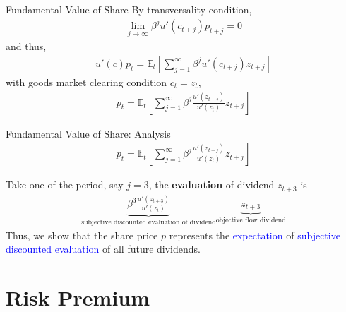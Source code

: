 \documentclass[aspectratio=169,xcolor=dvipsnames]{beamer}
\newcommand{\blue}[1]{\textcolor{blue}{#1}}
\begin{document}
\begin{frame}{Fundamental Value of Share}
\label{slide:Fundamental_Value_of_Share}
    By transversality condition,
    \begin{align}
        \lim_{j\rightarrow \infty} \beta^{j} u'(c_{t+j}) p_{t+j} = 0
    \end{align}
    and thus,
    \begin{align}
        u'(c) p_{t} = \mathbb{E}_{t}\left[
            \sum_{j=1}^{\infty} \beta^{j} u'(c_{t+j}) z_{t+j}
        \right]
    \end{align}
    with goods market clearing condition $ c_{t} = z_{t} $,
    \begin{align}
        p_{t} = \mathbb{E}_{t}\left[
            \sum_{j=1}^{\infty} \beta^{j} \frac{u'(z_{t+j})}{u'(z_{t})} z_{t+j}
        \right]
    \end{align}

\end{frame}

\begin{frame}{Fundamental Value of Share: Analysis}
\label{slide:Fundamental_Value_of_Share__Analysis}
    \begin{align}
        p_{t} = \mathbb{E}_{t}\left[
            \sum_{j=1}^{\infty} \beta^{j} \frac{u'(z_{t+j})}{u'(z_{t})} z_{t+j}
        \right]
    \end{align}

    Take one of the period, say $ j = 3 $, the \textbf{evaluation} of dividend $ z_{t+3} $ is
    \begin{align}
        \underbrace{\beta^{3} \frac{u'(z_{t+3})}{u'(z_{t})}}_{\text{subjective discounted evaluation of dividend}} \underbrace{z_{t+3}}_{\text{objective flow dividend}}
    \end{align}
    Thus, we show that the share price $ p $ represents the \blue{expectation} of \blue{subjective discounted evaluation} of all future dividends.
\end{frame}

\section{Risk Premium}
\label{sec:Risk_Premium}
\end{document}
